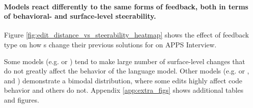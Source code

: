 \paragraph{Models react differently to the same forms of feedback, both in terms of behavioral- and surface-level steerability.} 
Figure \ref{fig:edit_distance_vs_steerability_heatmap} shows the effect of feedback type on how \cm s change their previous solutions for \gpt{} on APPS Interview.

Some models (e.g. \gemmaSmall{} or \reka) tend to make large number of surface-level changes that do not greatly affect the behavior of the language model.
Other models (e.g. \gpt{} or \sonnet, and \qwenLarge) demonstrate a bimodal distribution, where some edits highly affect code behavior and others do not.
Appendix \ref{app:extra_figs} shows additional tables and figures.




